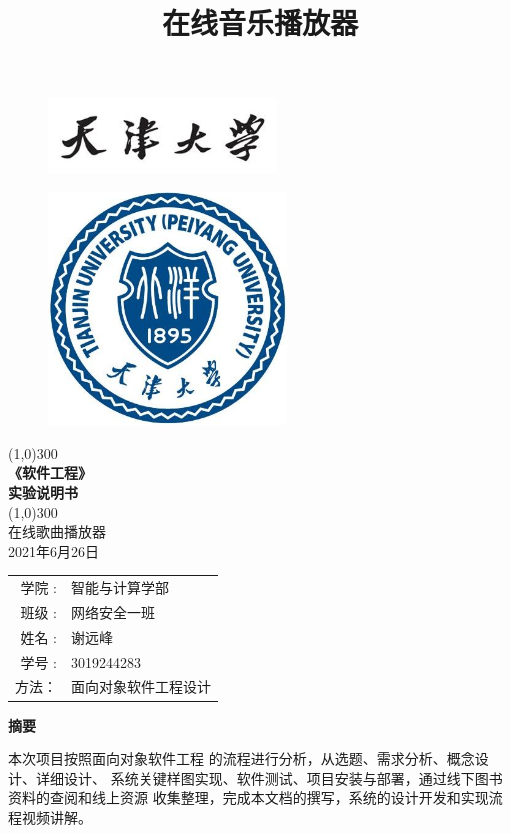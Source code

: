 \documentclass[UTF8,14pt]{article}
\title{在线音乐播放器}
\numberwithin{figure}{subsubsection}
\numberwithin{table}{subsubsection}
\begin{document}
\begin{titlepage}
	\begin{center}
		\begin{figure}[H]
			\centering
			\includegraphics[width=6.048cm,height=1.98cm]{Content.png}
		\end{figure}
		\begin{figure}[H]
			\centering
			\includegraphics[width=6.318cm,height=6.174cm]{封面.png}
		\end{figure}
		\vspace*{2cm}
		\line(1,0){300}\\
		[-0.2cm]
		\Huge{\bfseries 《软件工程》\\实验说明书}\\
		\vspace*{-0.7cm}
		\line(1,0){300}\\
		\LARGE {在线歌曲播放器\\
			2021年6月26日}\\
		[0.6cm]
		\Large{
			\begin{tabular}{rl}
				学院 :        & 智能与计算学部       \\
				班级 :        & 网络安全一班         \\
				姓名        : & 谢远峰               \\
				学号       :  & 3019244283           \\
				方法：        & 面向对象软件工程设计
			\end{tabular}
		}
	\end{center}

\end{titlepage}
\clearpage
\centerline{\Large{\bfseries{摘要}}}
\vspace*{0.5cm}
本次项目按照面向对象软件工程	的流程进行分析，从选题、需求分析、概念设计、详细设计、
系统关键样图实现、软件测试、项目安装与部署，通过线下图书资料的查阅和线上资源
收集整理，完成本文档的撰写，系统的设计开发和实现流程视频讲解。
\end{document}
